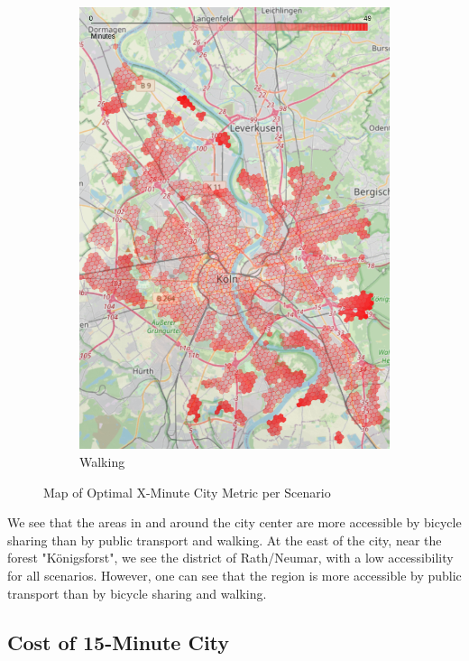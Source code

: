 \begin{figure}
\begin{subfigure}[b]{0.3\textwidth}
         \includegraphics[width=\textwidth]{Figures/results/minute_city_metric/walking_optimal_map}
         \caption{Walking}
         \label{fig:walking_optimal_map}
     \end{subfigure}
        \caption{Map of Optimal X-Minute City Metric per Scenario}
        \label{fig:optimal_map_per_scenario}
\end{figure}
We see that the areas in and around the city center are more accessible by bicycle sharing than by public transport and walking.
At the east of the city, near the forest "Königsforst", we see the district of Rath/Neumar, with a low accessibility for all scenarios.
However, one can see that the region is more accessible by public transport than by bicycle sharing and walking.

\subsection{Cost of 15-Minute City}
\label{subsec:cost_of_15_minute_city}

